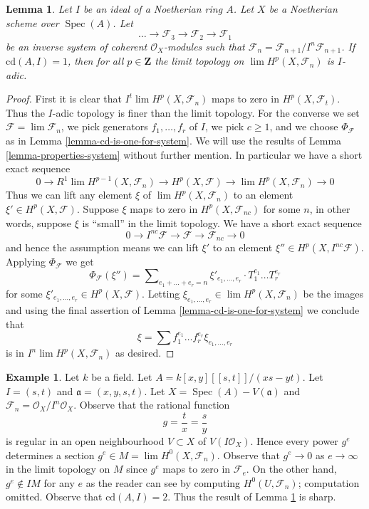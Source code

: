 \documentclass{stacks-project}
\theoremstyle{plain}
\newtheorem{lemma}[subsection]{Lemma}
\theoremstyle{definition}
\newtheorem{example}[subsection]{Example}
\theoremstyle{remark}
\numberwithin{equation}{subsection}
\def\lim{\mathop{\mathrm{lim}}\nolimits}
\def\Spec{\mathop{\mathrm{Spec}}}
\begin{document}
\begin{lemma}
\label{lemma-topology-I-adic}
Let $I$ be an ideal of a Noetherian ring $A$. Let $X$ be a Noetherian scheme
over $\Spec(A)$. Let
$$
\ldots \to \mathcal{F}_3 \to \mathcal{F}_2 \to \mathcal{F}_1
$$
be an inverse system of coherent $\mathcal{O}_X$-modules
such that $\mathcal{F}_n = \mathcal{F}_{n + 1}/I^n\mathcal{F}_{n + 1}$.
If $\text{cd}(A, I) = 1$, then for all $p \in \mathbf{Z}$ the limit topology on
$\lim H^p(X, \mathcal{F}_n)$ is $I$-adic.
\end{lemma}

\begin{proof}
First it is clear that $I^t \lim H^p(X, \mathcal{F}_n)$
maps to zero in $H^p(X, \mathcal{F}_t)$. Thus the $I$-adic topology
is finer than the limit topology. For the converse we set
$\mathcal{F} = \lim \mathcal{F}_n$, we pick generators $f_1, \ldots, f_r$
of $I$, we pick $c \geq 1$, and we choose
$\Phi_\mathcal{F}$ as in Lemma \ref{lemma-cd-is-one-for-system}.
We will use the results of Lemma \ref{lemma-properties-system}
without further mention. In particular we have a short exact
sequence
$$
0 \to R^1\lim H^{p - 1}(X, \mathcal{F}_n) \to H^p(X, \mathcal{F})
\to \lim H^p(X, \mathcal{F}_n) \to 0
$$
Thus we can lift any element $\xi$ of $\lim H^p(X, \mathcal{F}_n)$
to an element $\xi' \in H^p(X, \mathcal{F})$. Suppose $\xi$ maps to zero
in $H^p(X, \mathcal{F}_{nc})$ for some $n$, in other
words, suppose $\xi$ is ``small'' in the limit topology. We have a
short exact sequence
$$
0 \to I^{nc}\mathcal{F} \to \mathcal{F} \to \mathcal{F}_{nc} \to 0
$$
and hence the assumption means we can lift $\xi'$ to an element
$\xi'' \in H^p(X, I^{nc}\mathcal{F})$. Applying $\Phi_\mathcal{F}$
we get
$$
\Phi_\mathcal{F}(\xi'') = \sum\nolimits_{e_1 + \ldots + e_r = n}
\xi'_{e_1, \ldots, e_r} \cdot T_1^{e_1} \ldots T_r^{e_r}
$$
for some $\xi'_{e_1, \ldots, e_r} \in H^p(X, \mathcal{F})$.
Letting $\xi_{e_1, \ldots, e_r} \in \lim H^p(X, \mathcal{F}_n)$
be the images and using the final assertion of
Lemma \ref{lemma-cd-is-one-for-system}
we conclude that
$$
\xi = \sum f_1^{e_1} \ldots f_r^{e_r} \xi_{e_1, \ldots, e_r}
$$
is in $I^n \lim H^p(X, \mathcal{F}_n)$ as desired.
\end{proof}

\begin{example}
\label{example-not-I-adic}
Let $k$ be a field. Let $A = k[x, y][[s, t]]/(xs - yt)$.
Let $I = (s, t)$ and $\mathfrak a = (x, y, s, t)$.
Let $X = \Spec(A) - V(\mathfrak a)$ and
$\mathcal{F}_n = \mathcal{O}_X/I^n\mathcal{O}_X$.
Observe that the rational function
$$
g = \frac{t}{x} = \frac{s}{y}
$$
is regular in an open neighbourhood $V \subset X$ of
$V(I\mathcal{O}_X)$. Hence every power $g^e$ determines a section
$g^e \in M = \lim H^0(X, \mathcal{F}_n)$. Observe that
$g^e \to 0$ as $e \to \infty$ in the limit topology on $M$
since $g^e$ maps to zero in $\mathcal{F}_e$.
On the other hand, $g^e \not \in IM$ for any $e$
as the reader can see by computing $H^0(U, \mathcal{F}_n)$;
computation omitted. Observe that $\text{cd}(A, I) = 2$.
Thus the result of Lemma \ref{lemma-topology-I-adic} is sharp.
\end{example}
\end{document}
